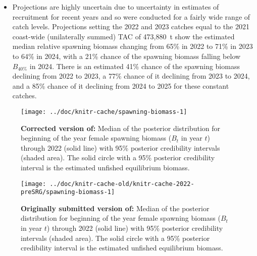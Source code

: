\documentclass[12pt]{book}\usepackage[]{graphicx}\usepackage[]{color}
\makeatletter
\def\maxwidth{ %
  \ifdim\Gin@nat@width>\linewidth
    \linewidth
  \else
    \Gin@nat@width
  \fi
}
\newenvironment{knitrout}{}{} %
\newcommand{\Bforty}{B_{40\%}}
\makeatother
\begin{document}
\begin{itemize}
  \item Projections are highly uncertain due to uncertainty in
estimates of recruitment for recent years and so were conducted for a fairly wide
range of catch levels. Projections setting the 2022 and
2023 catches equal to the 2021
coast-wide (unilaterally summed) TAC of
473,880~t show the estimated median relative spawning biomass
changing from
65\% in 2022 to
71\% in 2023 to
64\% in
2024, with a 21\% chance
of the spawning biomass falling below $\Bforty$ in 2024. There is an
estimated 41\% chance of the spawning biomass declining from 2022 to
2023, a
77\% chance of it declining from 2023 to
2024, and a 85\% chance of it declining
from 2024 to 2025 for these constant catches.
\end{itemize}

\clearpage

\begin{figure}[tbp]
\begin{center}
\begin{knitrout}
\color{fgcolor}
\texttt{[image: ../doc/knitr-cache/spawning-biomass-1]}
\end{knitrout}
\end{center}
\caption{{\bf Corrected version of:} Median of the posterior distribution for beginning of the year female
         spawning biomass ($B_t$ in year $t$) through 2022 (solid line) with 95\% posterior
         credibility intervals (shaded area). The solid circle with a 95\%
         posterior credibility interval is the estimated unfished equilibrium
         biomass.}
\label{fig:es-female-spawning-biomass}
\end{figure}


\clearpage

\begin{figure}[tbp]
\begin{center}
\begin{knitrout}
\color{fgcolor}
\texttt{[image: ../doc/knitr-cache-old/knitr-cache-2022-preSRG/spawning-biomass-1]}
\end{knitrout}
\end{center}
\caption{{\bf Originally submitted version of:} Median of the posterior distribution for beginning of the year female
         spawning biomass ($B_t$ in year $t$) through 2022 (solid line) with 95\% posterior
         credibility intervals (shaded area). The solid circle with a 95\%
         posterior credibility interval is the estimated unfished equilibrium
         biomass.}
\label{fig:es-female-spawning-biomass-old}
\end{figure}


\end{document}
